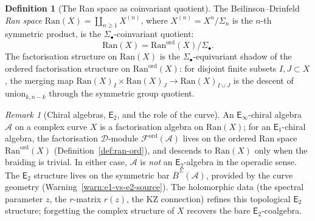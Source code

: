 \documentclass[11pt,reqno]{amsart}
\theoremstyle{definition}
\newtheorem{definition}[theorem]{Definition}
\theoremstyle{remark}
\newtheorem{remark}[theorem]{Remark}
\newcommand{\cA}{\mathcal{A}}
\newcommand{\cD}{\mathcal{D}}
\newcommand{\cF}{\mathcal{F}}
\newcommand{\Ran}{\mathrm{Ran}}
\newcommand{\Eone}{\mathsf{E}_{1}}
\newcommand{\Etwo}{\mathsf{E}_{2}}
\newcommand{\Einf}{\mathsf{E}_{\infty}}
\newcommand{\BarSig}{\overline{B}^{\Sigma}}
\numberwithin{equation}{section}
\begin{document}
\begin{definition}[The Ran space as coinvariant quotient]
\label{def:ran-space}
The Beilinson--Drinfeld \emph{Ran space}
$\Ran(X) = \coprod_{n \geq 1} X^{(n)}$, where
$X^{(n)} = X^n / \Sigma_n$ is the $n$-th symmetric product,
is the $\Sigma_\bullet$-coinvariant quotient:
\[
  \Ran(X) = \Ran^{\mathrm{ord}}(X) / \Sigma_\bullet.
\]
The factorisation structure on $\Ran(X)$ is the
$\Sigma_\bullet$-equivariant shadow of the ordered
factorisation structure on $\Ran^{\mathrm{ord}}(X)$: for
disjoint finite subsets $I, J \subset X$, the merging map
$\Ran(X)_I \times \Ran(X)_J \to \Ran(X)_{I \cup J}$ is
the descent of $\mathrm{union}_{k,n-k}$ through the
symmetric group quotient.
\end{definition}

\begin{remark}[Chiral algebras, $\Etwo$, and the role of the curve]
\label{rem:chiral-e2}
An $\Einf$-chiral algebra $\cA$ on a complex curve $X$ is a
factorisation algebra on $\Ran(X)$; for an $\Eone$-chiral
algebra, the factorisation $\cD$-module
$\cF^{\mathrm{ord}}(\cA)$ lives on the ordered Ran space
$\Ran^{\mathrm{ord}}(X)$
(Definition~\ref{def:ran-ord}), and descends to
$\Ran(X)$ only when the braiding is trivial.
In either case, $\cA$ is \emph{not} an
$\Etwo$-algebra in the operadic sense. The $\Etwo$
structure lives on the symmetric bar $\BarSig(\cA)$,
provided by the curve geometry
(Warning~\ref{warn:e1-vs-e2-source}).
The holomorphic data
(the spectral parameter $z$, the $r$-matrix $r(z)$,
the KZ connection) refines this topological $\Etwo$
structure; forgetting the complex structure of $X$
recovers the bare $\Etwo$-coalgebra.
\end{remark}
\end{document}
